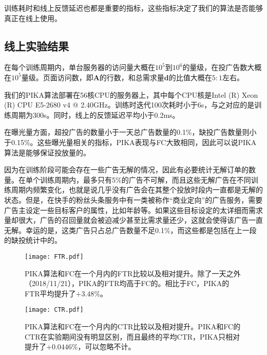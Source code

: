 训练耗时和线上反馈延迟也都是重要的指标，这些指标决定了我们的算法是否能够真正在线上使用。

\subsection{线上实验结果}

在每个训练周期内，单台服务器的访问量大概在$10^5$到$10^6$的量级，在投广告数大概在$10^5$量级。页面访问数，即$\bm{A}$的行数，和总需求量$\bm{d}$的比值大概在$5:1$左右。

我们的PIKA算法部署在56核CPU的服务器上，其中每个CPU核是Intel (R) Xeon (R) CPU E5-2680 v4 @ 2.40GHz。训练时迭代100次耗时小于6s，与之对应的是训练周期为300s。同时，线上的反馈延迟平均小于0.2ms。

在曝光量方面，超投广告的数量小于一天总广告数量的0.1\%，缺投广告数量则小于0.15\%。这些曝光量相关的指标，PIKA表现与FC大致相同，因此可以说PIKA算法是能够保证投放量的。

因为在训练阶段可能会存在一些广告无解的情况，因此有必要统计无解订单的数量。在单个训练周期内，最多只有5\%的广告不可解，而且这些无解广告在不同训练周期内频繁变化，也就是说几乎没有广告会在其整个投放时段内一直都是无解的状态。但是，在快手的粉丝头条服务中有一类被称作“商业定向”的广告服务，需要广告主设定一些目标客户的属性，比如年龄等。如果这些目标设定的太详细而需求量却很大，广告的召回量就会被迫减少甚至比需求量还少，这就会使得该广告一直无解。幸运的是，这类广告只占总广告数量不足0.1\%，而这些都是包括在上一段的缺投统计中的。

\begin{figure}[tb]
	\centering
	\texttt{[image: FTR.pdf]}
	\caption{PIKA算法和FC在一个月内的FTR比较以及相对提升。除了一天之外（2018/11/21），PIKA的FTR均高于FC的。相比于FC，PIKA的FTR平均提升了$+3.48\%$。}
	\label{fig:FTR}
\end{figure}

\begin{figure}[tb]
	\centering
	\texttt{[image: CTR.pdf]}
	\caption{PIKA算法和FC在一个月内的CTR比较以及相对提升。PIKA和FC的CTR在实验期间没有明显区别，而且最终的平均CTR，PIKA只相对提升了$+0.0446\%$，可以忽略不计。}
	\label{fig:CTR}
\end{figure}

